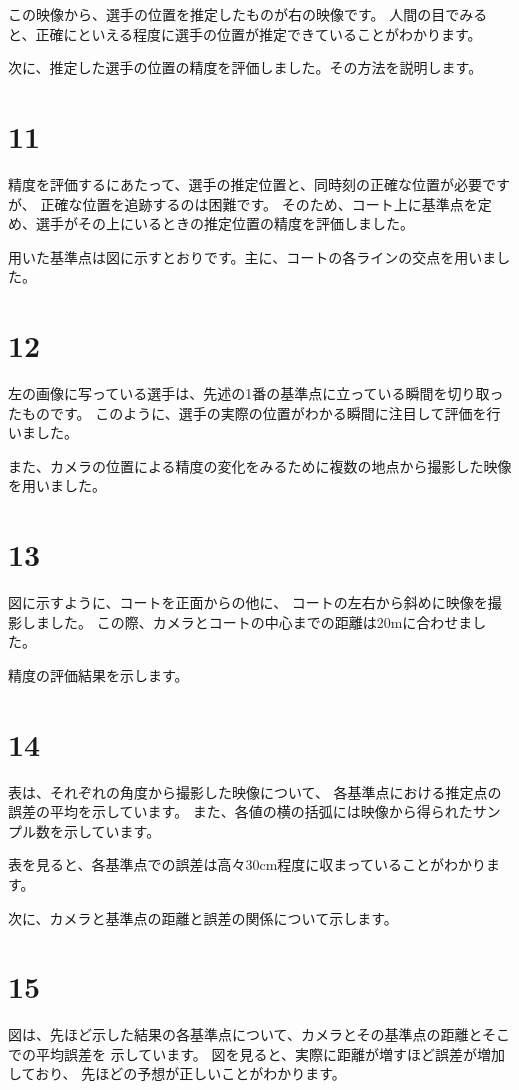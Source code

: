 \documentclass[]{jsarticle}
\begin{document}
    この映像から、選手の位置を推定したものが右の映像です。
    人間の目でみると、正確にといえる程度に選手の位置が推定できていることがわかります。

    次に、推定した選手の位置の精度を評価しました。その方法を説明します。
\section*{11}
    精度を評価するにあたって、選手の推定位置と、同時刻の正確な位置が必要ですが、
    正確な位置を追跡するのは困難です。
    そのため、コート上に基準点を定め、選手がその上にいるときの推定位置の精度を評価しました。

    用いた基準点は図に示すとおりです。主に、コートの各ラインの交点を用いました。
\section*{12}
    左の画像に写っている選手は、先述の1番の基準点に立っている瞬間を切り取ったものです。
    このように、選手の実際の位置がわかる瞬間に注目して評価を行いました。

    また、カメラの位置による精度の変化をみるために複数の地点から撮影した映像を用いました。
\section*{13}
    図に示すように、コートを正面からの他に、
    コートの左右から斜めに映像を撮影しました。
    この際、カメラとコートの中心までの距離は20mに合わせました。

    精度の評価結果を示します。
\section*{14}
    表は、それぞれの角度から撮影した映像について、
    各基準点における推定点の誤差の平均を示しています。
    また、各値の横の括弧には映像から得られたサンプル数を示しています。

    表を見ると、各基準点での誤差は高々30cm程度に収まっていることがわかります。

    次に、カメラと基準点の距離と誤差の関係について示します。
\section*{15}
    図は、先ほど示した結果の各基準点について、カメラとその基準点の距離とそこでの平均誤差を
    示しています。
    図を見ると、実際に距離が増すほど誤差が増加しており、
    先ほどの予想が正しいことがわかります。
\end{document}
